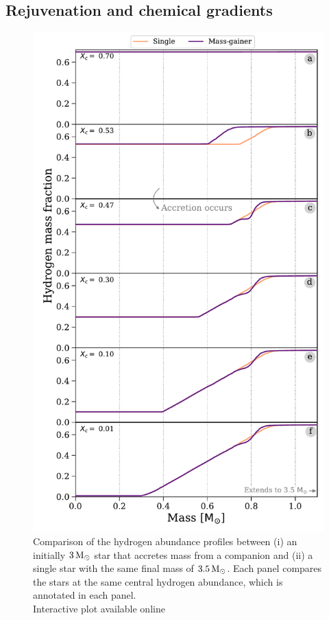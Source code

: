 \documentclass[desactivate]{aa}
\begin{document}
\subsection{Rejuvenation and chemical gradients}\label{sec:xh_profiles}

\begin{figure}[tb]
    \centering
    \includegraphics[width=\columnwidth]{figures/XH_profile_all.pdf}
    \caption{Comparison of the hydrogen abundance profiles between (i) an initially $3 \, {\rm M_\odot}$ star that accretes mass from a companion and (ii) a single star with the same final mass of $3.5 \, {\rm M_\odot}$. Each panel compares the stars at the same central hydrogen abundance, which is annotated in each panel.\\Interactive plot available online \href{www.tomwagg.com/html/interact/mass-gainer-asteroseismology.html\#fig2-4}{\faChartArea}}
    \label{fig:XH_profiles}
\end{figure}
\end{document}
